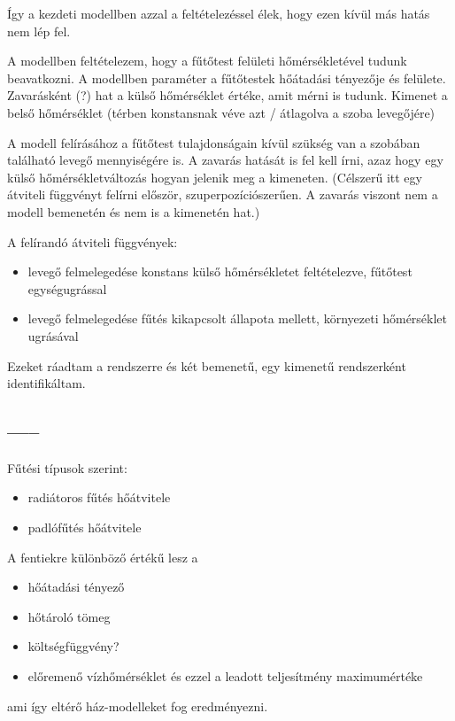 Így a kezdeti modellben azzal a feltételezéssel élek, hogy ezen kívül más hatás nem lép fel.

A modellben feltételezem, hogy a fűtőtest felületi hőmérsékletével tudunk beavatkozni. A modellben paraméter a fűtőtestek hőátadási tényezője és felülete. Zavarásként (?) hat a külső hőmérséklet értéke, amit mérni is tudunk. Kimenet a belső hőmérséklet (térben konstansnak véve azt / átlagolva a szoba levegőjére)

A modell felírásához a fűtőtest tulajdonságain kívül szükség van a szobában található levegő mennyiségére is. A zavarás hatását is fel kell írni, azaz hogy egy külső hőmérsékletváltozás hogyan jelenik meg a kimeneten. (Célszerű itt egy átviteli függvényt felírni először, szuperpozíciószerűen. A zavarás viszont nem a modell bemenetén és nem is a kimenetén hat.)

A felírandó átviteli függvények:

\begin{itemize}[noitemsep,topsep=0pt,parsep=0pt,partopsep=0pt]
	\item levegő felmelegedése konstans külső hőmérsékletet feltételezve, fűtőtest egységugrással
	\item levegő felmelegedése fűtés kikapcsolt állapota mellett, környezeti hőmérséklet ugrásával
\end{itemize}

Ezeket ráadtam a rendszerre és két bemenetű, egy kimenetű rendszerként identifikáltam.




\subsection{-----}

Fűtési típusok szerint:

\begin{itemize}[noitemsep,topsep=0pt,parsep=0pt,partopsep=0pt]
	\item radiátoros fűtés hőátvitele
	\item padlófűtés hőátvitele
\end{itemize}

A fentiekre különböző értékű lesz a 

\begin{itemize}[noitemsep,topsep=0pt,parsep=0pt,partopsep=0pt]
	\item hőátadási tényező
	\item hőtároló tömeg
	\item költségfüggvény?
	\item előremenő vízhőmérséklet és ezzel a leadott teljesítmény maximumértéke
\end{itemize}

ami így eltérő ház-modelleket fog eredményezni.










\pagebreak